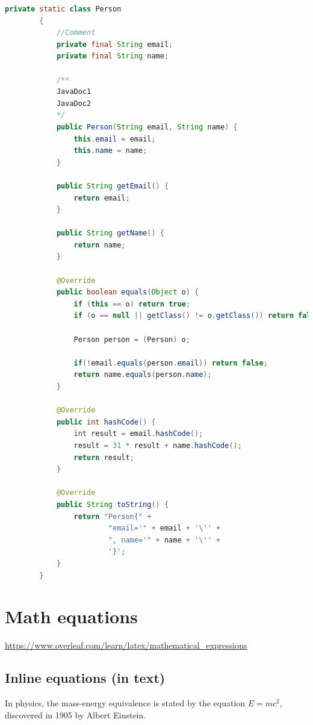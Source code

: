\documentclass{report}
\begin{document}
    \begin{lstlisting}[language=Java]
        private static class Person
        {
            //Comment
            private final String email;
            private final String name;
    
            /**
            JavaDoc1
            JavaDoc2
            */
            public Person(String email, String name) {
                this.email = email;
                this.name = name;
            }
    
            public String getEmail() {
                return email;
            }
    
            public String getName() {
                return name;
            }
    
            @Override
            public boolean equals(Object o) {
                if (this == o) return true;
                if (o == null || getClass() != o.getClass()) return false;
    
                Person person = (Person) o;
    
                if(!email.equals(person.email)) return false;
                return name.equals(person.name);
            }
    
            @Override
            public int hashCode() {
                int result = email.hashCode();
                result = 31 * result + name.hashCode();
                return result;
            }
    
            @Override
            public String toString() {
                return "Person{" +
                        "email='" + email + '\'' +
                        ", name='" + name + '\'' +
                        '}';
            }
        }
    \end{lstlisting}
    
    \chapter{Math equations}
    \url{https://www.overleaf.com/learn/latex/mathematical_expressions}
    \section{Inline equations (in text)}
    In physics, the mass-energy equivalence is stated 
    by the equation $E=mc^2$, discovered in 1905 by Albert Einstein.
\end{document}
